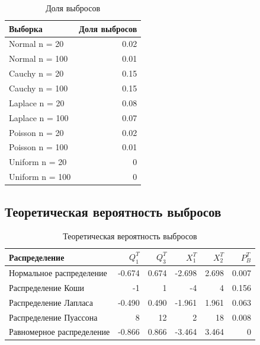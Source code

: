 \begin{table}[H]
	\centering
		\begin{tabular}[t]{|l|r|}
			\hline
			Выборка & Доля выбросов\\
			\hline
			Normal n = 20   &  0.02\\
			\hline
			Normal n = 100   &  0.01\\
			\hline
			Cauchy n = 20   &  0.15\\
			\hline
			Cauchy n = 100   &  0.15\\
			\hline
			Laplace n = 20   &  0.08 \\
			\hline
			Laplace n = 100   &  0.07 \\
			\hline
			Poisson n = 20   &  0.02 \\
			\hline
			Poisson n = 100   &  0.01 \\
			\hline
			Uniform n = 20   &  0\\
			\hline
			Uniform n = 100   &  0\\
			\hline
		\end{tabular}
		\caption{Доля выбросов}
		\label{tab:experimental_fraction_of_outliers}
	\end{table}
	
\subsection{Теоретическая вероятность выбросов}
\label{subsec:result_outliers_probability}
    \begin{table}[H]
	    \centering
		\begin{tabular}[t]{|l|r|r|r|r|r|}
			\hline
			Распределение   &      $Q_1^T$	& $Q_3^T$ & $X_1^T$ & $X_2^T$ & $P_B^T$	\\
			\hline
			Нормальное распределение 	& -0.674& 0.674 & -2.698 	&  2.698 	& 0.007 \\
			\hline
			Распределение Коши 			& -1	& 1		&  -4		& 4			& 0.156 \\
			\hline
			Распределение Лапласа 		& -0.490& 0.490	& -1.961	& 1.961		& 0.063 \\
			\hline
			Распределение Пуассона 		& 8		& 12	& 2			& 18		& 0.008 \\
			\hline
			Равномерное распределение 	&-0.866 & 0.866	& -3.464 	& 3.464 	& 0	\\
			\hline
		\end{tabular}
		\caption{Теоретическая вероятность выбросов}
		\label{tab:theoretical_probability_of_outliers}
\end{table}